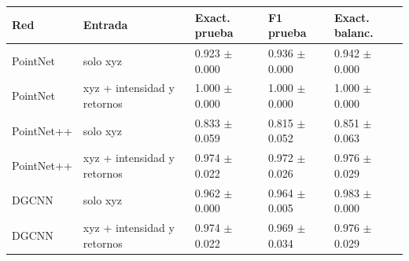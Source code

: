 \begin{tabular}{lllll}
\toprule
Red & Entrada & Exact. prueba & F1 prueba & Exact. balanc. \\
\midrule
PointNet & solo xyz & 0.923 $\pm$ 0.000 & 0.936 $\pm$ 0.000 & 0.942 $\pm$ 0.000 \\
PointNet & xyz + intensidad y retornos & 1.000 $\pm$ 0.000 & 1.000 $\pm$ 0.000 & 1.000 $\pm$ 0.000 \\
PointNet++ & solo xyz & 0.833 $\pm$ 0.059 & 0.815 $\pm$ 0.052 & 0.851 $\pm$ 0.063 \\
PointNet++ & xyz + intensidad y retornos & 0.974 $\pm$ 0.022 & 0.972 $\pm$ 0.026 & 0.976 $\pm$ 0.029 \\
DGCNN & solo xyz & 0.962 $\pm$ 0.000 & 0.964 $\pm$ 0.005 & 0.983 $\pm$ 0.000 \\
DGCNN & xyz + intensidad y retornos & 0.974 $\pm$ 0.022 & 0.969 $\pm$ 0.034 & 0.976 $\pm$ 0.029 \\
\bottomrule
\end{tabular}

